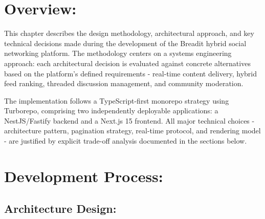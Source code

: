 
\section{Overview:}

This chapter describes the design methodology, architectural approach, and key technical decisions made during the development of the Breadit hybrid social networking platform. The methodology centers on a systems engineering approach: each architectural decision is evaluated against concrete alternatives based on the platform's defined requirements - real-time content delivery, hybrid feed ranking, threaded discussion management, and community moderation.

The implementation follows a TypeScript-first monorepo strategy using Turborepo, comprising two independently deployable applications: a NestJS/Fastify backend and a Next.js 15 frontend. All major technical choices - architecture pattern, pagination strategy, real-time protocol, and rendering model - are justified by explicit trade-off analysis documented in the sections below.

\section{Development Process:}

\subsection{Architecture Design:}

